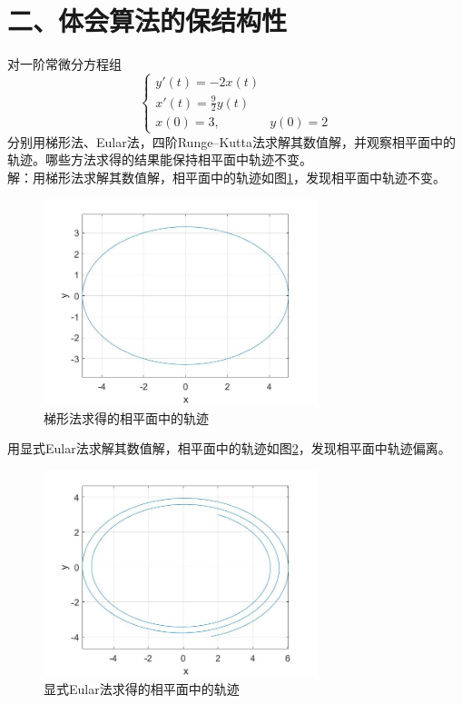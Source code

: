 \documentclass[10pt,a4paper]{article}
\begin{document}
\section*{二、体会算法的保结构性}
对一阶常微分方程组
\[
\left\{\begin{array}{ll}
y'(t)=-2x(t)\\
x'(t)=\frac{9}{2}y(t)\\
x(0)=3,&y(0)=2
\end{array}\right.
\]
分别用梯形法、Eular法，四阶Runge--Kutta法求解其数值解，并观察相平面中的轨迹。哪些方法求得的结果能保持相平面中轨迹不变。\\
解：用梯形法求解其数值解，相平面中的轨迹如图\ref{2_1}，发现相平面中轨迹不变。
\begin{figure}[h]
\centering
\includegraphics[width=8cm]{Trapezoid_2.jpg}
\caption{梯形法求得的相平面中的轨迹}\label{2_1}
\end{figure}

用显式Eular法求解其数值解，相平面中的轨迹如图\ref{2_2}，发现相平面中轨迹偏离。
\begin{figure}[h]
\centering
\includegraphics[width=8cm]{ExplEular_2.jpg}
\caption{显式Eular法求得的相平面中的轨迹}\label{2_2}
\end{figure}
\end{document}
